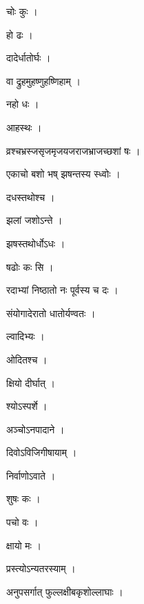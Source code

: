 \documentclass[10pt, openany]{book}
\begin{document}
\noindent चोः कुः ।

\noindent हो ढः ।

\noindent दादेर्धातोर्घः ।

\noindent वा द्रुहमुहष्णुहष्णिहाम् ।

\noindent नहो धः ।

\noindent आहस्थः ।

\noindent व्रश्चभ्रस्जसृजमृजयजराजभ्राजच्छशां षः ।

\noindent एकाचो बशो भष् झषन्तस्य स्ध्वोः ।

\noindent दधस्तथोश्च ।

\noindent झलां जशोऽन्ते ।

\noindent झषस्तथोर्धोऽधः ।

\noindent षढोः कः सि ।

\noindent रदाभ्यां निष्ठातो नः पूर्वस्य च दः ।

\noindent संयोगादेरातो धातोर्यण्वतः ।

\noindent ल्वादिभ्यः ।

\noindent ओदितश्च ।

\noindent क्षियो दीर्घात् ।

\noindent श्योऽस्पर्शे ।

\noindent अञ्चोऽनपादाने ।

\noindent दिवोऽविजिगीषायाम् ।

\noindent निर्वाणोऽवाते ।

\noindent शुषः कः ।

\noindent पचो वः ।

\noindent क्षायो मः ।

\noindent प्रस्त्योऽन्यतरस्याम् ।

\noindent अनुपसर्गात् फुल्लक्षीबकृशोल्लाघाः ।
\end{document}
